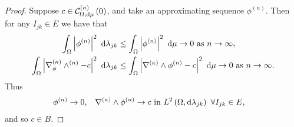 \begin{proof}
	Suppose $c\in\mathcal{C}_{ \Omega, \mathrm{d}\mu}^{(\kappa)}\left( 0 \right)$, and take an approximating sequence $\phi^{(n)}$.
	Then for any $I_{jk}\in E$ we have that
	\begin{align*}
		\int_{\Omega}\left\lvert \phi^{(n)} \right\rvert^2 \ \mathrm{d}\lambda_{jk} 
		&\leq \int_{\Omega}\left\lvert \phi^{(n)} \right\rvert^2 \ \mathrm{d}\mu \rightarrow 0 \ \text{as} \ n \rightarrow\infty, \\
		\int_{\Omega}\left\lvert \nabla_{\phi}^{(\kappa)}\wedge^{(n)} - c \right\rvert^2 \ \mathrm{d}\lambda_{jk}
		&\leq \int_{\Omega}\left\lvert \nabla_{}^{(\kappa)}\wedge\phi^{(n)} - c \right\rvert^2 \ \mathrm{d}\mu \rightarrow 0 \ \text{as} \ n \rightarrow\infty.
	\end{align*}
	Thus
	\begin{align*}
		\phi^{(n)}\rightarrow 0, &\quad \kcurl{}\phi^{(n)}\rightarrow c \text{ in } \ltwo{\ddom}{\lambda_{jk}} \ \forall I_{jk}\in E,
	\end{align*}
	and so $c\in B$.
\end{proof}

